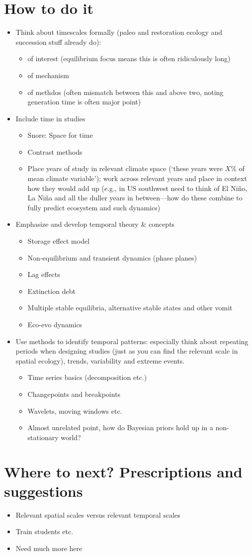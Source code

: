 \documentclass[11pt,a4paper]{article}
\newenvironment{smitemize}{
\begin{itemize}
  \setlength{\itemsep}{1pt}
  \setlength{\parskip}{0pt}
  \setlength{\parsep}{0pt}}
{\end{itemize}
}
\newcommand*\dashme{\item[--]}
\begin{document}
\section{How to do it}
\begin{smitemize}
\dashme Think about timescales formally (paleo and restoration ecology and succession stuff already do):
\begin{smitemize}
\dashme of interest (equilibrium focus means this is often ridiculously long)
\dashme of mechanism
\dashme of methdos (often mismatch between this and above two, noting generation time is often major point)
\end{smitemize}
\dashme Include time in studies
\begin{smitemize}
\dashme Snore: Space for time
\dashme Contrast methods
\dashme Place years of study in relevant climate space (`these years were \(X\%\) of mean climate variable'); work across relevant years and place in context how they would add up (e.g., in US southwest need to think of El Ni\~no, La Ni\~na and all the duller years in between---how do these combine to fully predict ecosystem and such dynamics) 
\end{smitemize}
\dashme Emphasize and develop temporal theory \& concepts
\begin{smitemize}
\dashme Storage effect model
\dashme Non-equilibrium and transient dynamics (phase planes)
\dashme Lag effects
\dashme Extinction debt
\dashme Multiple stable equilibria, alternative stable states and other vomit
\dashme Eco-evo dynamics
\end{smitemize}
\dashme Use methods to identify temporal patterns: especially think about repeating periods when designing studies (just as you can find the relevant scale in spatial ecology), trends, variability and extreme events.
\begin{smitemize}
\dashme Time series basics (decomposition etc.)
\dashme Changepoints and breakpoints
\dashme Wavelets, moving windows etc. 
\dashme Almost unrelated point, how do Bayesian priors hold up in a non-stationary world?
\end{smitemize}
\end{smitemize}
\section{Where to next? Prescriptions and suggestions}
\begin{smitemize}
\dashme Relevant spatial scales versus relevant temporal scales
\dashme Train students etc. 
\dashme Need much more here
\end{smitemize}
\end{document}
